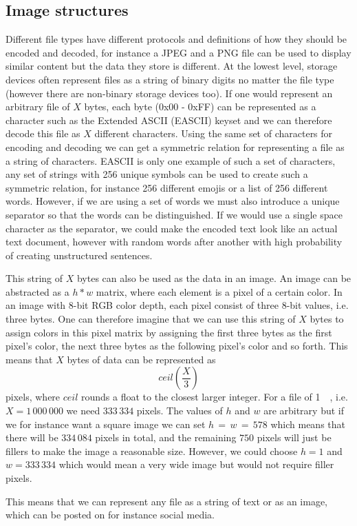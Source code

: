 \subsection{Image structures}
Different file types have different protocols and definitions of how they should be encoded and decoded, for instance a JPEG and a PNG file can be used to display similar content but the data they store is different. At the lowest level, storage devices often represent files as a string of binary digits no matter the file type (however there are non-binary storage devices too\cite{MultistateDataStorage2020}). If one would represent an arbitrary file of $X$ bytes, each byte (0x00 - 0xFF) can be represented as a character such as the Extended ASCII (EASCII) keyset and we can therefore decode this file as $X$ different characters. Using the same set of characters for encoding and decoding we can get a symmetric relation for representing a file as a string of characters. EASCII is only one example of such a set of characters, any set of strings with 256 unique symbols can be used to create such a symmetric relation, for instance 256 different emojis or a list of 256 different words. However, if we are using a set of words we must also introduce a unique separator so that the words can be distinguished. If we would use a single space character as the separator, we could make the encoded text look like an actual text document, however with random words after another with high probability of creating unstructured sentences.

This string of $X$ bytes can also be used as the data in an image. An image can be abstracted as a $h * w$ matrix, where each element is a pixel of a certain color. In an image with 8-bit RGB color depth, each pixel consist of three 8-bit values, i.e. three bytes. One can therefore imagine that we can use this string of $X$ bytes to assign colors in this pixel matrix by assigning the first three bytes as the first pixel's color, the next three bytes as the following pixel's color and so forth. This means that $X$ bytes of data can be represented as 
$$ceil(\frac{X}{3})$$ 
pixels, where $ceil$ rounds a float to the closest larger integer. For a file of \SI{1}{\mega\byte}, i.e. $X = 1\,000\,000$ we need $333\,334$ pixels. The values of $h$ and $w$ are arbitrary but if we for instance want a square image we can set $ h\,=\,w\,=\,578$ which means that there will be $334\,084$ pixels in total, and the remaining $750$ pixels will just be fillers to make the image a reasonable size. However, we could choose $h = 1$ and $w = 333\,334$ which would mean a very wide image but would not require filler pixels. 

This means that we can represent any file as a string of text or as an image, which can be posted on for instance social media. 
